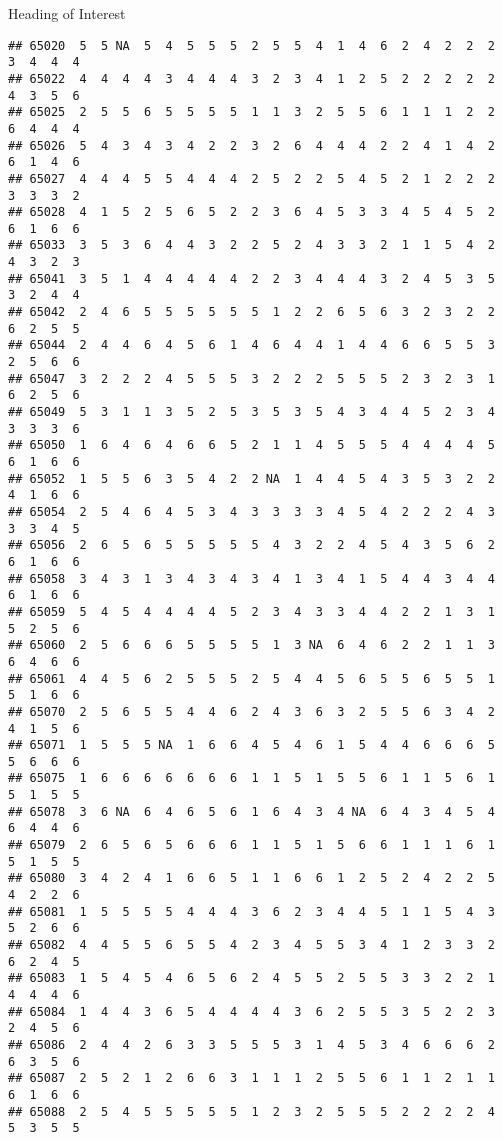 \documentclass[
  ignorenonframetext,
]{beamer}
\begin{document}
\begin{frame}[fragile]{Heading of Interest}
\begin{verbatim}
## 65020  5  5 NA  5  4  5  5  5  2  5  5  4  1  4  6  2  4  2  2  2  3  4  4  4
## 65022  4  4  4  4  3  4  4  4  3  2  3  4  1  2  5  2  2  2  2  2  4  3  5  6
## 65025  2  5  5  6  5  5  5  5  1  1  3  2  5  5  6  1  1  1  2  2  6  4  4  4
## 65026  5  4  3  4  3  4  2  2  3  2  6  4  4  4  2  2  4  1  4  2  6  1  4  6
## 65027  4  4  4  5  5  4  4  4  2  5  2  2  5  4  5  2  1  2  2  2  3  3  3  2
## 65028  4  1  5  2  5  6  5  2  2  3  6  4  5  3  3  4  5  4  5  2  6  1  6  6
## 65033  3  5  3  6  4  4  3  2  2  5  2  4  3  3  2  1  1  5  4  2  4  3  2  3
## 65041  3  5  1  4  4  4  4  4  2  2  3  4  4  4  3  2  4  5  3  5  3  2  4  4
## 65042  2  4  6  5  5  5  5  5  5  1  2  2  6  5  6  3  2  3  2  2  6  2  5  5
## 65044  2  4  4  6  4  5  6  1  4  6  4  4  1  4  4  6  6  5  5  3  2  5  6  6
## 65047  3  2  2  2  4  5  5  5  3  2  2  2  5  5  5  2  3  2  3  1  6  2  5  6
## 65049  5  3  1  1  3  5  2  5  3  5  3  5  4  3  4  4  5  2  3  4  3  3  3  6
## 65050  1  6  4  6  4  6  6  5  2  1  1  4  5  5  5  4  4  4  4  5  6  1  6  6
## 65052  1  5  5  6  3  5  4  2  2 NA  1  4  4  5  4  3  5  3  2  2  4  1  6  6
## 65054  2  5  4  6  4  5  3  4  3  3  3  3  4  5  4  2  2  2  4  3  3  3  4  5
## 65056  2  6  5  6  5  5  5  5  5  4  3  2  2  4  5  4  3  5  6  2  6  1  6  6
## 65058  3  4  3  1  3  4  3  4  3  4  1  3  4  1  5  4  4  3  4  4  6  1  6  6
## 65059  5  4  5  4  4  4  4  5  2  3  4  3  3  4  4  2  2  1  3  1  5  2  5  6
## 65060  2  5  6  6  6  5  5  5  5  1  3 NA  6  4  6  2  2  1  1  3  6  4  6  6
## 65061  4  4  5  6  2  5  5  5  2  5  4  4  5  6  5  5  6  5  5  1  5  1  6  6
## 65070  2  5  6  5  5  4  4  6  2  4  3  6  3  2  5  5  6  3  4  2  4  1  5  6
## 65071  1  5  5  5 NA  1  6  6  4  5  4  6  1  5  4  4  6  6  6  5  5  6  6  6
## 65075  1  6  6  6  6  6  6  6  1  1  5  1  5  5  6  1  1  5  6  1  5  1  5  5
## 65078  3  6 NA  6  4  6  5  6  1  6  4  3  4 NA  6  4  3  4  5  4  6  4  4  6
## 65079  2  6  5  6  5  6  6  6  1  1  5  1  5  6  6  1  1  1  6  1  5  1  5  5
## 65080  3  4  2  4  1  6  6  5  1  1  6  6  1  2  5  2  4  2  2  5  4  2  2  6
## 65081  1  5  5  5  5  4  4  4  3  6  2  3  4  4  5  1  1  5  4  3  5  2  6  6
## 65082  4  4  5  5  6  5  5  4  2  3  4  5  5  3  4  1  2  3  3  2  6  2  4  5
## 65083  1  5  4  5  4  6  5  6  2  4  5  5  2  5  5  3  3  2  2  1  4  4  4  6
## 65084  1  4  4  3  6  5  4  4  4  4  3  6  2  5  5  3  5  2  2  3  2  4  5  6
## 65086  2  4  4  2  6  3  3  5  5  5  3  1  4  5  3  4  6  6  6  2  6  3  5  6
## 65087  2  5  2  1  2  6  6  3  1  1  1  2  5  5  6  1  1  2  1  1  6  1  6  6
## 65088  2  5  4  5  5  5  5  5  1  2  3  2  5  5  5  2  2  2  2  4  5  3  5  5

\end{verbatim}
\end{frame}
\end{document}
